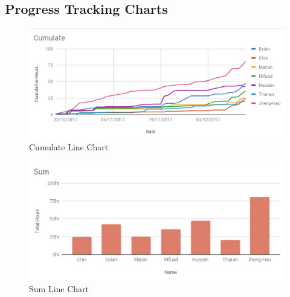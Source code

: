 \documentclass[12pt,a4paper]{article}
\begin{document}
\begin{appendices}
      \begin{table}[H]
        \centering
        \caption{Progress Tracking Form Label} 
      \end{table} 

    \section{Progress Tracking Charts}
      \label{appendix:progess-tracking-charts}
      \begin{figure}[H]
        \centering
        \includegraphics[width=1\textwidth]{../assets/12-9-4-progress-tracking-chart-cumulate.jpg}
        \caption{Cumulate Line Chart}
        \label{fig:Cumulate Line Chart}
      \end{figure}

      \begin{figure}[H]
        \centering
        \includegraphics[width=1\textwidth]{../assets/12-9-4-progress-tracking-chart-sum.jpg}
        \caption{Sum Line Chart}
        \label{fig:Sum Line Chart}
      \end{figure}


\end{appendices}
\end{document}
